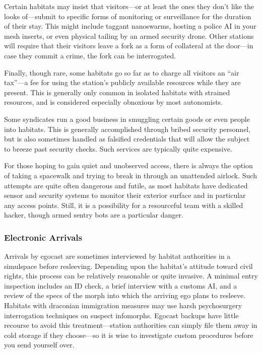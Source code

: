 Certain habitats may insist that visitors—or at 
least the ones they don't like the looks of—submit to 
specific forms of monitoring or surveillance for the 
duration of their stay. This might include taggant 
nanoswarms, hosting a police AI in your mesh inserts, 
or even physical tailing by an armed security drone. 
Other stations will require that their visitors leave a 
fork as a form of collateral at the door—in case they 
commit a crime, the fork can be interrogated.

Finally, though rare, some habitats go so far as to 
charge all visitors an ``air tax''—a fee for using the 
station's publicly available resources while they are 
present. This is generally only common in isolated 
habitats with strained resources, and is considered 
especially obnoxious by most autonomists.

Some syndicates run a good business in smuggling 
certain goods or even people into habitats. This is generally
accomplished through bribed security personnel,
but is also sometimes handled as falsified credentials 
that will allow the subject to breeze past security 
checks. Such services are typically quite expensive.

For those hoping to gain quiet and unobserved 
access, there is always the option of taking a spacewalk
and trying to break in through an unattended
airlock. Such attempts are quite often dangerous and 
futile, as most habitats have dedicated sensor and 
security systems to monitor their exterior surface and 
in particular any access points. Still, it is a possibility 
for a resourceful team with a skilled hacker, though 
armed sentry bots are a particular danger.

\subsubsection{Electronic Arrivals}

Arrivals by egocast are sometimes interviewed by 
habitat authorities in a simulspace before resleeving. 
Depending upon the habitat's attitude toward civil 
rights, this process can be relatively reasonable or 
quite invasive. A minimal entry inspection includes an 
ID check, a brief interview with a customs AI, and a 
review of the specs of the morph into which the arriving
ego plans to resleeve. Habitats with draconian
immigration measures may use harsh psychosurgery 
interrogation techniques on suspect infomorphs. Egocast
backups have little recourse to avoid this treatment—station
authorities can simply file them away
in cold storage if they choose—so it is wise to investigate
custom procedures before you send yourself over.

